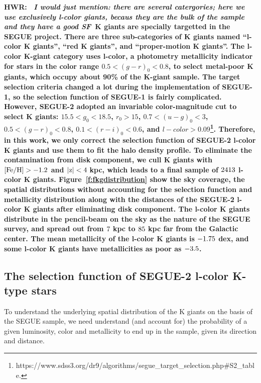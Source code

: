 \documentclass[12pt,preprint]{aastex}
\newcommand{\feh}{{\rm [Fe/H]}}
\begin{document}
\bf{HWR:~} \textit{I would just mention: there are several catergories; here we use exclusively l-color giants, becaus they are the bulk of the sample and they have a good SF}\  K giants are specially targetted in the SEGUE project. There are three sub-categories of K giants named ``l-color K giants'', ``red K giants'', and ``proper-motion K giants''. The l-color K-giant category uses l-color, a photometry metallicity indicator for stars in the color range $0.5 < (g-r)_0 < 0.8$, to select metal-poor K giants, which occupy about 90\% of the K-giant sample. The target selection criteria changed a lot during the implementation of SEGUE-1, so the selection function of SEGUE-1 is fairly complicated. However, SEGUE-2 adopted an invariable color-magnitude cut to select K giants: $15.5<g_0<18.5$, $r_0>15$, $0.7<(u-g)_0<3$, $0.5<(g-r)_0<0.8$, $0.1<(r-i)_0<0.6$, and $l-color>0.09$\footnote{https://www.sdss3.org/dr9/algorithms/segue\_target\_selection.php\#S2\_table.}. Therefore, in this work, we only correct the selection function of SEGUE-2 l-color K giants and use them to fit the halo density profile. To eliminate the contamination from disk component, we cull K giants with $\rm \feh>-1.2$ and $\rm |z|<4~$kpc, which leads to a final sample of $\rm 2413$ l-color K giants. Figure~\ref{f:fkgdistribution} show the sky coverage, the spatial distributions without accounting for the selection function and metallicity distribution along with the distances of the SEGUE-2 l-color K giants after eliminating disk component. The l-color K giants distribute in the pencil-beam on the sky as the nature of the SEGUE survey, and spread out from $\rm 7~$kpc to $\rm 85~$kpc far from the Galactic center. The mean metallicity of the l-color K giants is $\rm -1.75~$dex, and some l-color K giants have metallicities as poor as $\rm -3.5$.

 

\subsection{The selection function of SEGUE-2 l-color K-type stars}

To understand the underlying spatial distribution of the K giants on the basis of the SEGUE sample, we need understand (and account for) the probability of a given luminosity, color and metallicity to end up in the sample, given its direction and distance. 
\end{document}
